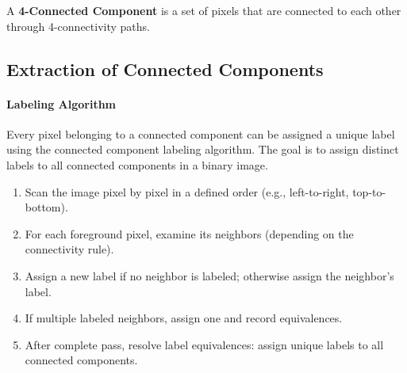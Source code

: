 
\noindent A \textbf{4-Connected Component} is a set of pixels that are connected to each other through 4-connectivity paths. 

\subsection{Extraction of Connected Components}



  
\paragraph{Labeling Algorithm} Every pixel belonging to a connected component can be assigned a unique label using the connected component labeling algorithm. The goal is to assign distinct labels to all connected components in a binary image.
\begin{enumerate}
    \item Scan the image pixel by pixel in a defined order (e.g., left-to-right, top-to-bottom).
    \item For each foreground pixel, examine its neighbors (depending on the connectivity rule).
    \item Assign a new label if no neighbor is labeled; otherwise assign the neighbor’s label.
    \item If multiple labeled neighbors, assign one and record equivalences.
    \item After complete pass, resolve label equivalences: assign unique labels to all connected components.
\end{enumerate}

